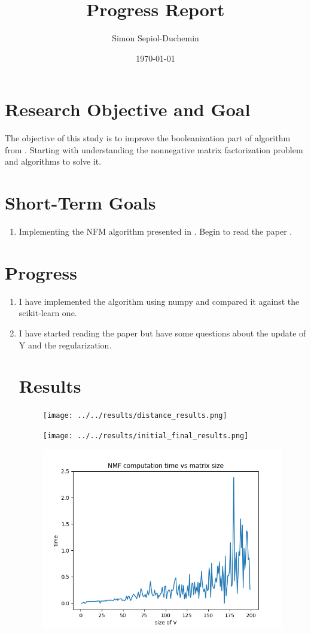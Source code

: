 \documentclass[a4paper,11pt]{article}
\title{Progress Report}
\author{Simon Sepiol-Duchemin}
\date{\today}
\begin{document}
%
\maketitle
\thispagestyle{empty}
%
\section{Research Objective and Goal}
The objective of this study is to improve the booleanization part of algorithm from \cite{9521203}. Starting with understanding the nonnegative matrix factorization problem and algorithms to solve it.
\section{Short-Term Goals}
\begin{enumerate}
\item Implementing the NFM algorithm presented in \cite{9521203}. Begin to read the paper \cite{9521203}.
\end{enumerate}
\section{Progress}
\begin{enumerate}
\item I have implemented the algorithm using numpy and compared it against the scikit-learn one.
\item I have started reading the paper but have some questions about the update of Y and the regularization. 
\section{Results}
\begin{figure}[H]
    \texttt{[image: ../../results/distance\_results.png]}
\end{figure}
\begin{figure}[H]
    \texttt{[image: ../../results/initial\_final\_results.png]}
\end{figure}
\begin{figure}[H]
    \includegraphics{../../results/time_results.png}
\end{figure}
\end{enumerate}



\end{document}
